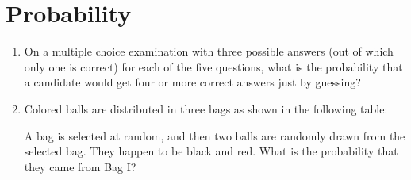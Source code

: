 \documentclass{article}
\begin{document}
                                                                                                                      

\section*{Probability}                                             

\begin{enumerate}                                                  

\item On a multiple choice examination with three possible answers (out of which only one is correct) for each of the five questions, what is the probability that a candidate would get four or more correct answers just by guessing?  

\item Colored balls are distributed in three bags as shown in the following table:

\begin{table}[h]                                                         
\centering
{}                                               
\end{table}

A bag is selected at random, and then two balls are randomly drawn from the selected bag. They happen to be black and red. What is the probability that they came from Bag I?

\end{enumerate}
\end{document}
